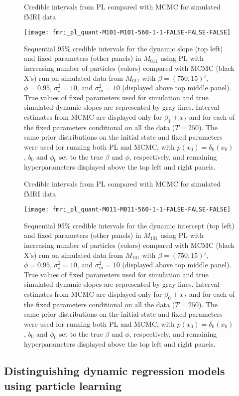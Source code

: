 \begin{figure}
\ssp
\centering
\caption{Credible intervals from PL compared with MCMC for simulated fMRI data} \label{fig:fmri:quant:M011}
\texttt{[image: fmri\_pl\_quant-M101-M101-560-1-1-FALSE-FALSE-FALSE]}
\caption*{Sequential 95\% credible intervals for the dynamic slope (top left) and fixed parameters (other panels) in $M_{011}$ using PL with increasing number of particles (colors) compared with MCMC (black X's) run on simulated data from $M_{011}$ with $\beta = (750,15)'$, $\phi = 0.95$, $\sigma^2_s = 10$, and $\sigma^2_m = 10$ (displayed above top middle panel). True values of fixed parameters used for simulation and true simulated dynamic slopes are represented by gray lines. Interval estimates from MCMC are displayed only for $\beta_1 + x_T$ and for each of the fixed parameters conditional on all the data ($T = 250$). The same prior distributions on the initial state and fixed parameters were used for running both PL and MCMC, with $p(x_0) = \delta_{0}(x_0)$, $b_0$ and $\phi_0$ set to the true $\beta$ and $\phi$, respectively, and remaining hyperparameters displayed above the top left and right panels.}
\end{figure}

\begin{figure}
\ssp
\centering
\caption{Credible intervals from PL compared with MCMC for simulated fMRI data} \label{fig:fmri:quant:M101}
\texttt{[image: fmri\_pl\_quant-M011-M011-560-1-1-FALSE-FALSE-FALSE]}
\caption*{Sequential 95\% credible intervals for the dynamic intercept (top left) and fixed parameters (other panels) in $M_{101}$ using PL with increasing number of particles (colors) compared with MCMC (black X's) run on simulated data from $M_{101}$ with $\beta = (750,15)'$, $\phi = 0.95$, $\sigma^2_s = 10$, and $\sigma^2_m = 10$ (displayed above top middle panel). True values of fixed parameters used for simulation and true simulated dynamic slopes are represented by gray lines. Interval estimates from MCMC are displayed only for $\beta_0 + x_T$ and for each of the fixed parameters conditional on all the data ($T = 250$). The same prior distributions on the initial state and fixed parameters were used for running both PL and MCMC, with $p(x_0) = \delta_{0}(x_0)$, $b_0$ and $\phi_0$ set to the true $\beta$ and $\phi$, respectively, and remaining hyperparameters displayed above the top left and right panels.}
\end{figure}

\subsection{Distinguishing dynamic regression models using particle learning \label{sec:fmri:dist}}

